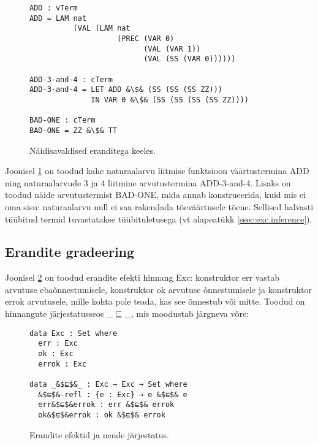 \documentclass[a4paper,12pt]{article}
\begin{document}
\begin{figure}
  \begin{lstlisting}
ADD : vTerm
ADD = LAM nat
          (VAL (LAM nat
                    (PREC (VAR 0)
                          (VAL (VAR 1))
                          (VAL (SS (VAR 0))))))

ADD-3-and-4 : cTerm
ADD-3-and-4 = LET ADD &\$& (SS (SS (SS ZZ)))
              IN VAR 0 &\$& (SS (SS (SS (SS ZZ))))

BAD-ONE : cTerm
BAD-ONE = ZZ &\$& TT
  \end{lstlisting}
  \caption{Näidisavaldised eranditega keeles.}
  \label{fig:exc.raw.ex1}
\end{figure}

Joonisel \ref{fig:exc.raw.ex1} on toodud kahe naturaalarvu liitmise funktsioon väärtustermina ADD
ning naturaalarvude 3 ja 4 liitmine arvutustermina ADD-3-and-4.
Lisaks on toodud näide arvutustermist BAD-ONE, mida annab konstrueerida,
kuid mis ei oma sisu: naturaalarvu null ei saa rakendada tõeväärtusele tõene.
Sellised halvasti tüübitud termid tuvastatakse tüübituletusega (vt alapeatükk \ref{ssec:exc.inference}).

\subsection{Erandite gradeering} \label{ssec:exc.grading}

Joonisel \ref{fig:exc.exc} on toodud erandite efekti hinnang Exc: konstruktor err vastab arvutuse ebaõnnestumisele, konstruktor ok arvutuse õnnestumisele ja konstruktor errok arvutusele, mille kohta pole teada, kas see õnnestub või mitte. Toodud on hinnangute järjestatusseos _$⊑$_, mis moodustab järgneva võre:
\begin{center}
\end{center}
\begin{figure}
  \begin{lstlisting}
data Exc : Set where
  err : Exc
  ok : Exc
  errok : Exc
  
data _&$⊑$&_ : Exc → Exc → Set where
  &$⊑$&-refl : {e : Exc} → e &$⊑$& e
  err&$⊑$&errok : err &$⊑$& errok
  ok&$⊑$&errok : ok &$⊑$& errok
  \end{lstlisting}
  \caption{Erandite efektid ja nende järjestatus.}
  \label{fig:exc.exc}
\end{figure}
\end{document}
